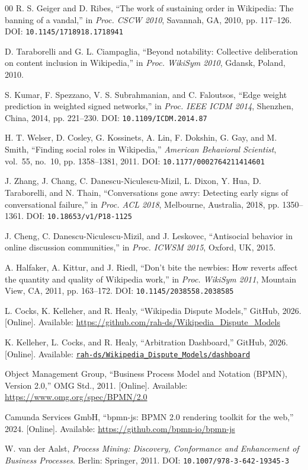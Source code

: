 \documentclass[conference]{IEEEtran}
\newcommand{\ghrepo}{\url{https://github.com/rah-ds/Wikipedia_Dispute_Models}}
\begin{document}
\begin{thebibliography}{00}
R. S. Geiger and D. Ribes,
``The work of sustaining order in Wikipedia: The banning of a vandal,''
in \textit{Proc. CSCW 2010}, Savannah, GA, 2010, pp. 117--126.
DOI: \texttt{10.1145/1718918.1718941}

D. Taraborelli and G. L. Ciampaglia,
``Beyond notability: Collective deliberation on content inclusion in Wikipedia,''
in \textit{Proc. WikiSym 2010}, Gdansk, Poland, 2010.

S. Kumar, F. Spezzano, V. S. Subrahmanian, and C. Faloutsos,
``Edge weight prediction in weighted signed networks,''
in \textit{Proc. IEEE ICDM 2014}, Shenzhen, China, 2014, pp. 221--230.
DOI: \texttt{10.1109/ICDM.2014.87}

H. T. Welser, D. Cosley, G. Kossinets, A. Lin, F. Dokshin, G. Gay, and M. Smith,
``Finding social roles in Wikipedia,''
\textit{American Behavioral Scientist}, vol.~55, no.~10, pp. 1358--1381, 2011.
DOI: \texttt{10.1177/0002764211414601}

J. Zhang, J. Chang, C. Danescu-Niculescu-Mizil, L. Dixon, Y. Hua,
D. Taraborelli, and N. Thain,
``Conversations gone awry: Detecting early signs of conversational failure,''
in \textit{Proc. ACL 2018}, Melbourne, Australia, 2018, pp. 1350--1361.
DOI: \texttt{10.18653/v1/P18-1125}

J. Cheng, C. Danescu-Niculescu-Mizil, and J. Leskovec,
``Antisocial behavior in online discussion communities,''
in \textit{Proc. ICWSM 2015}, Oxford, UK, 2015.

A. Halfaker, A. Kittur, and J. Riedl,
``Don't bite the newbies: How reverts affect the quantity and
quality of Wikipedia work,''
in \textit{Proc. WikiSym 2011}, Mountain View, CA, 2011, pp. 163--172.
DOI: \texttt{10.1145/2038558.2038585}

L. Cocks, K. Kelleher, and R. Healy,
``Wikipedia Dispute Models,'' GitHub, 2026.
[Online]. Available: \ghrepo

K. Kelleher, L. Cocks, and R. Healy,
``Arbitration Dashboard,'' GitHub, 2026.
[Online]. Available:
\href{https://github.com/rah-ds/Wikipedia_Dispute_Models/tree/main/dashboard}{\texttt{rah-ds/Wikipedia\_Dispute\_Models/dashboard}}

Object Management Group,
``Business Process Model and Notation (BPMN), Version 2.0,''
OMG Std., 2011. [Online]. Available: \url{https://www.omg.org/spec/BPMN/2.0}

Camunda Services GmbH,
``bpmn-js: BPMN 2.0 rendering toolkit for the web,'' 2024.
[Online]. Available: \url{https://github.com/bpmn-io/bpmn-js}

W. van der Aalst,
\textit{Process Mining: Discovery, Conformance and Enhancement of
Business Processes}.
Berlin: Springer, 2011.
DOI: \texttt{10.1007/978-3-642-19345-3}

\end{thebibliography}
\end{document}
